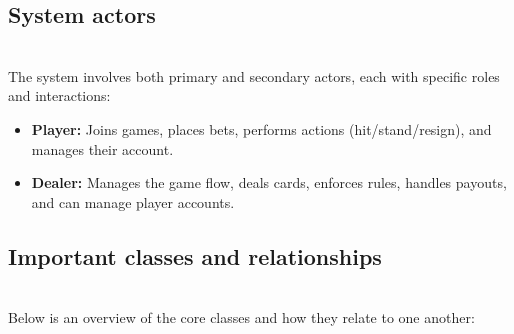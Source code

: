 \subsection{System actors}\label{WGBrCTZXvVeMgQHlMD-2C}
\\
The system involves both primary and secondary actors, each with specific roles and interactions:

\begin{itemize}
\item
\protect{}\label{wWZmIvNGECxos4dOLncz6}
\textbf{Player:} Joins games, places bets, performs actions (hit/stand/resign), and manages their account.
\item
\protect{}\label{E49wUEj8IVz5GL5eqvccw}
\textbf{Dealer:} Manages the game flow, deals cards, enforces rules, handles payouts, and can manage player accounts.
\end{itemize}

\subsection{Important classes and relationships}\label{6ipJqcbitfKHgXCrrZNkC}
\\
Below is an overview of the core classes and how they relate to one another:

